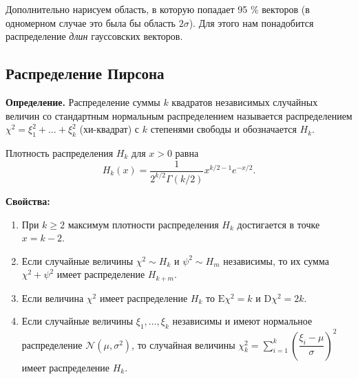 \documentclass[11pt,a4paper]{article}
\providecommand{\tightlist}{%
      \setlength{\itemsep}{0pt}\setlength{\parskip}{0pt}}
\begin{document}
    \begin{center}
    \end{center}
    
    Дополнительно нарисуем область, в которую попадает 95 \% векторов (в
одномерном случае это была бы область \(2\sigma\)). Для этого нам
понадобится распределение \emph{длин} гауссовских векторов.

    \hypertarget{ux440ux430ux441ux43fux440ux435ux434ux435ux43bux435ux43dux438ux435-ux43fux438ux440ux441ux43eux43dux430}{%
\subsection{Распределение
Пирсона}\label{ux440ux430ux441ux43fux440ux435ux434ux435ux43bux435ux43dux438ux435-ux43fux438ux440ux441ux43eux43dux430}}

\textbf{Определение.} Распределение суммы \(k\) квадратов независимых
случайных величин со стандартным нормальным распределением называется
распределением \(\chi^2 = \xi_1^2 + \ldots + \xi_k^2\) (хи-квадрат) с
\(k\) степенями свободы и обозначается \(H_k\).

Плотность распределения \(H_k\) для \(x>0\) равна \[
  H_k(x) = \dfrac{1}{2^{k/2}\Gamma(k/2)} x^{k/2-1} e^{-x/2}.
\]

    \textbf{Свойства:}

\begin{enumerate}
\def\labelenumi{\arabic{enumi}.}
\tightlist
\item
  При \(k\ge2\) максимум плотности распределения \(H_k\) достигается в
  точке \(x=k-2\).
\item
  Если случайные величины \(\chi^2 \sim H_k\) и \(\psi^2 \sim H_m\)
  независимы, то их сумма \(\chi^2 + \psi^2\) имеет распределение
  \(H_{k+m}\).
\item
  Если величина \(\chi^2\) имеет распределение \(H_k\) то
  \(\mathrm{E} \chi^2 = k\) и \(\mathrm{D} \chi^2 = 2k\).
\item
  Если случайные величины \(\xi_1, \ldots, \xi_k\) независимы и имеют
  нормальное распределение \(\mathcal{N}(\mu, \sigma^2)\), то случайная
  величины
  \(\chi_k^2 = \sum\limits_{i=1}^{k} \left( \dfrac{\xi_i-\mu}{\sigma} \right)^2\)
  имеет распределение \(H_k\).
\end{enumerate}
\end{document}
